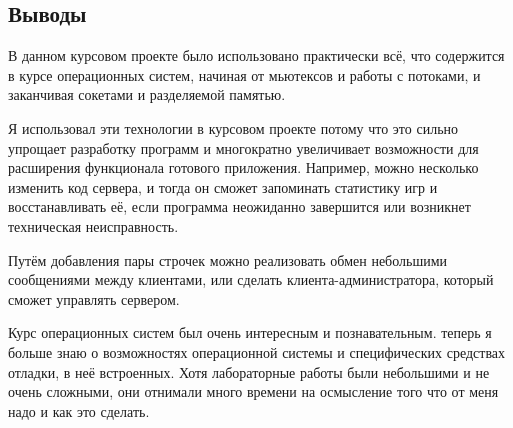 \documentclass[12pt]{article}
\begin{document}
\subsection*{Выводы}

В данном курсовом проекте было использовано практически всё, что содержится в курсе операционных систем, начиная от мьютексов и работы с потоками, и заканчивая сокетами и разделяемой памятью. 

Я использовал эти технологии в курсовом проекте потому что это сильно упрощает разработку программ и многократно увеличивает возможности для расширения функционала готового приложения. Например, можно несколько изменить код сервера, и тогда он сможет запоминать статистику игр и восстанавливать её, если программа неожиданно завершится или возникнет техническая неисправность. 

Путём добавления пары строчек можно реализовать обмен небольшими сообщениями между клиентами, или сделать клиента-администратора, который сможет управлять сервером.

Курс операционных систем был очень интересным  и познавательным. теперь я больше знаю о возможностях операционной системы и специфических средствах отладки, в неё встроенных. Хотя лабораторные работы были небольшими и не очень сложными, они отнимали много времени на осмысление того что от меня надо и как это сделать. 
\end{document}
